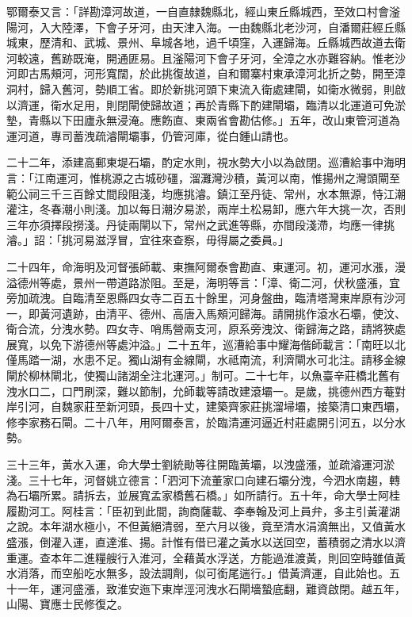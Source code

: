 \begin{pinyinscope}
鄂爾泰又言：「詳勘漳河故道，一自直隸魏縣北，經山東丘縣城西，至效口村會滏陽河，入大陸澤，下會子牙河，由天津入海。一由魏縣北老沙河，自潘爾莊經丘縣城東，歷清和、武城、景州、阜城各地，過千頃窪，入運歸海。丘縣城西故道去衛河較遠，舊跡既淹，開通匪易。且滏陽河下會子牙河，全漳之水亦難容納。惟老沙河即古馬頰河，河形寬闊，於此挑復故道，自和爾寨村東承漳河北折之勢，開至漳洞村，歸入舊河，勢順工省。即於新挑河頭下東流入衛處建閘，如衛水微弱，則啟以濟運，衛水足用，則閉閘使歸故道；再於青縣下酌建閘壩，臨清以北運道可免淤墊，青縣以下田廬永無浸淹。應飭直、東兩省會勘估修。」五年，改山東管河道為運河道，專司蓄洩疏濬閘壩事，仍管河庫，從白鍾山請也。

二十二年，添建高郵東堤石壩，酌定水則，視水勢大小以為啟閉。巡漕給事中海明言：「江南運河，惟桃源之古城砂礓，溜灘灣沙積，黃河以南，惟揚州之灣頭閘至範公祠三千三百餘丈間段阻淺，均應挑濬。鎮江至丹徒、常州，水本無源，恃江潮灌注，冬春潮小則淺。加以每日潮汐易淤，兩岸土松易卸，應六年大挑一次，否則三年亦須擇段撈淺。丹徒兩閘以下，常州之武進等縣，亦間段淺滯，均應一律挑濬。」詔：「挑河易滋浮冒，宜往來查察，毋得屬之委員。」

二十四年，命海明及河督張師載、東撫阿爾泰會勘直、東運河。初，運河水漲，漫溢德州等處，景州一帶道路淤阻。至是，海明等言：「漳、衛二河，伏秋盛漲，宜旁加疏洩。自臨清至恩縣四女寺二百五十餘里，河身盤曲，臨清塔灣東岸原有沙河一，即黃河遺跡，由清平、德州、高唐入馬頰河歸海。請開挑作滾水石壩，使汶、衛合流，分洩水勢。四女寺、哨馬營兩支河，原系旁洩汶、衛歸海之路，請將狹處展寬，以免下游德州等處沖溢。」二十五年，巡漕給事中耀海偕師載言：「南旺以北僅馬踏一湖，水患不足。獨山湖有金線閘，水祗南流，利濟閘水可北注。請移金線閘於柳林閘北，使獨山諸湖全注北運河。」制可。二十七年，以魚臺辛莊橋北舊有洩水口二，口門刷深，難以節制，允師載等請改建滾壩一。是歲，挑德州西方菴對岸引河，自魏家莊至新河頭，長四十丈，建築齊家莊挑溜埽壩，接築清口東西壩，修李家務石閘。二十八年，用阿爾泰言，於臨清運河逼近村莊處開引河五，以分水勢。

三十三年，黃水入運，命大學士劉統勛等往開臨黃壩，以洩盛漲，並疏濬運河淤淺。三十七年，河督姚立德言：「泗河下流董家口向建石壩分洩，今泗水南趨，轉為石壩所累。請拆去，並展寬孟家橋舊石橋。」如所請行。五十年，命大學士阿桂履勘河工。阿桂言：「臣初到此間，詢商薩載、李奉翰及河上員弁，多主引黃灌湖之說。本年湖水極小，不但黃絕清弱，至六月以後，竟至清水涓滴無出，又值黃水盛漲，倒灌入運，直達淮、揚。計惟有借已灌之黃水以送回空，蓄積弱之清水以濟重運。查本年二進糧艘行入淮河，全藉黃水浮送，方能過淮渡黃，則回空時雖值黃水消落，而空船吃水無多，設法調劑，似可銜尾遄行。」借黃濟運，自此始也。五十一年，運河盛漲，致淮安迤下東岸涇河洩水石閘墻蟄底翻，難資啟閉。越五年，山陽、寶應士民修復之。


\end{pinyinscope}
